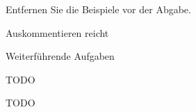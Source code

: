 \documentclass[
    inlineshortcut=java, %
    corporatedesign, %
    boxarc, %
    fop, %
]{algoexercise}
\begin{document}
    \begin{vanforderung}
        Entfernen Sie die Beispiele vor der Abgabe.
    \end{vanforderung}

    \begin{hinweis}
        Auskommentieren reicht
    \end{hinweis}

    \clearpage{}

    \setcounter{task}{4}
    \begin{task}[points=30]{Weiterführende Aufgaben}\label{ex:P5}
        \begin{subtask}[title=Neue Spielmechaniken,points=10]\label{ex:P5.1}
            TODO
        \end{subtask}

        \begin{subtask}[title=KI als Gegner?,points=10]\label{ex:P5.2}
            TODO
        \end{subtask}
    \end{task}
\end{document}
